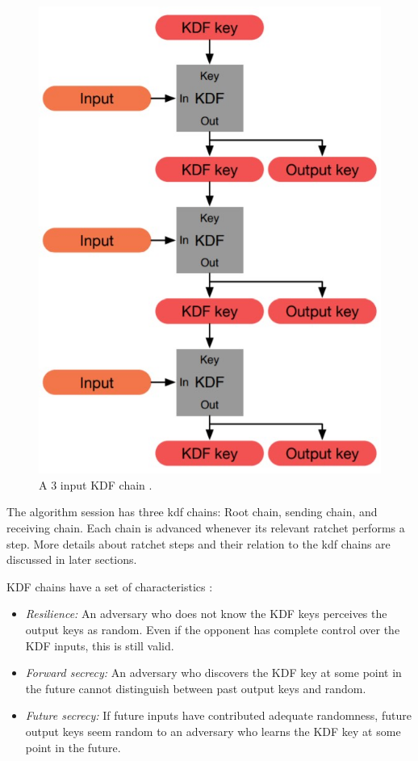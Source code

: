\begin{figure}[hptb]
	\centering
	\includegraphics[scale=0.4]{Images/kdf-chain.jpg}
	\caption{A 3 input KDF chain \cite{dblRtcht}.}
	\label{fig:kdf-chain}
\end{figure}

The algorithm session has three \gls{kdf} chains: Root chain, sending chain, and receiving chain. Each chain is advanced whenever its relevant ratchet performs a step. More details about ratchet steps and their relation to the \gls{kdf} chains are discussed in later sections.
\par
KDF chains have a set of characteristics \cite{dblRtcht}:
\begin{itemize}
	\item \textit{Resilience:} An adversary who does not know the KDF keys perceives the output keys as random. Even if the opponent has complete control over the KDF inputs, this is still valid.
	
	\item \textit{Forward secrecy:} An adversary who discovers the KDF key at some point in the future cannot distinguish between past output keys and random.
	
	\item \textit{Future secrecy:} If future inputs have contributed adequate randomness, future output keys seem random to an adversary who learns the KDF key at some point in the future.
\end{itemize}

